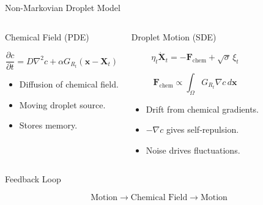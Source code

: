 \begin{frame}{Non-Markovian Droplet Model}

	\begin{columns}[T]


		\begin{block}{Chemical Field (PDE)}

			\[
				\frac{\partial c}{\partial t}
				=
				D\nabla^2 c
				+
				\alpha G_{R_t}(\mathbf{x}-\mathbf{X}_t)
			\]

			\begin{itemize}
				\item Diffusion of chemical field.
				\item Moving droplet source.
				\item Stores memory.
			\end{itemize}

		\end{block}


		\begin{alertblock}{Droplet Motion (SDE)}

			\[
				\eta_t \dot{\mathbf X}_t
				=
				-\mathbf F_{\mathrm{chem}}
				+
				\sqrt{\sigma}\,\xi_t
			\]

			\vspace{-0.1cm}

			\[
				\mathbf F_{\mathrm{chem}}
				\propto
				\int_{\Omega}
				G_{R_t}
				\nabla c\,d\mathbf x
			\]

			\begin{itemize}
				\item Drift from chemical gradients.
				\item $-\nabla c$ gives self-repulsion.
				\item Noise drives fluctuations.
			\end{itemize}

		\end{alertblock}
	\end{columns}

	\vspace{0.15cm}

	\begin{alertblock}{Feedback Loop}

		\[
			\text{Motion}
			\rightarrow
			\text{Chemical Field}
			\rightarrow
			\text{Motion}
		\]

	\end{alertblock}

	\vspace{0.2cm}


\end{frame}

